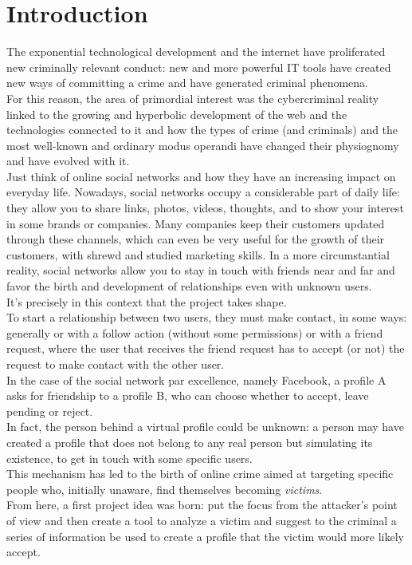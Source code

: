 
\chapter{Introduction}
\label{cap:introduzione}
The exponential technological development and the internet have proliferated new criminally relevant conduct: new and more powerful IT tools have created new ways of committing a crime and have generated criminal phenomena.
\\For this reason, the area of primordial interest was the cybercriminal reality linked to the growing and hyperbolic development of the web and the technologies connected to it and how the types of crime (and criminals) and the most well-known and ordinary modus operandi have changed their physiognomy and have evolved with it.
\\Just think of online social networks and how they have an increasing impact on everyday life. Nowadays, social networks occupy a considerable part of daily life: they allow you to share links, photos, videos, thoughts, and to show your interest in some brands or companies. Many companies keep their customers updated through these channels, which can even be very useful for the growth of their customers, with shrewd and studied marketing skills.
In a more circumstantial reality, social networks allow you to stay in touch with friends near and far and favor the birth and development of relationships even with unknown users.
\\It's precisely in this context that the project takes shape. 
\\To start a relationship between two users, they must make contact, in some ways: generally or with a follow action (without some permissions) or with a friend request, where the user that receives the friend request has to accept (or not) the request to make contact with the other user. 
\\In the case of the social network par excellence, namely Facebook, a profile A asks for friendship to a profile B, who can choose whether to accept, leave pending or reject.
\\In fact, the person behind a virtual profile could be unknown: a person may have created a profile that does not belong to any real person but simulating its existence, to get in touch with some specific users.
\\This mechanism has led to the birth of online crime aimed at targeting specific people who, initially unaware, find themselves becoming \textit{victims}.\\From here, a first project idea was born: put the focus from the attacker's point of view and then create a tool to analyze a victim and suggest to the criminal a series of information be used to create a profile that the victim would more likely accept.

